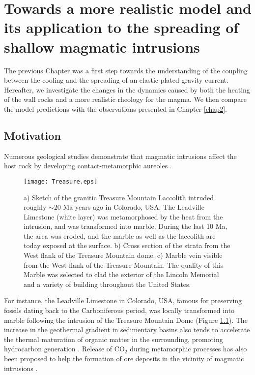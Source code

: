 \chapter[Towards a more realistic model]{Towards a more realistic model
  and its application to the spreading of shallow magmatic intrusions}
\label{Heating}

\minitoc

The previous Chapter was a first  step towards the understanding of the
coupling between  the cooling and  the spreading of  an elastic-plated
gravity  current.   Hereafter,  we  investigate  the  changes  in  the
dynamics  caused by  both the  heating of  the wall  rocks and  a more
realistic  rheology  for  the  magma.    We  then  compare  the  model
predictions with the observations presented in Chapter \ref{chap2}.


\section{Motivation}
\label{sec:introduction}

Numerous  geological  studies  demonstrate  that  magmatic  intrusions
affect  the  host  rock  by  developing  contact-metamorphic  aureoles
\citep{Jaeger:1959du,Galushkin:1997dy,Senger:2014tt}.  
\begin{figure}[h!]
  \begin{center}
    \graphicspath{ {/Users/thorey/Documents/These/Manuscript/Figure/Chapter4/} }
    \texttt{[image: Treasure.eps]}
    \caption{a)  Sketch of  the granitic  Treasure Mountain  Laccolith
      intruded roughly  $\sim 20$ Ma  years ago in Colorado,  USA. The
      Leadville Limestone (white layer)  was metamorphosed by the heat
      from the intrusion, and was transformed into marble.  During the
      last $10$ Ma, the area was eroded, and the marble as well as the
      laccolith are today exposed at the surface.  b) Cross section of
      the strata from the West flank of the Treasure Mountain dome. c)
      Marble  vein  visible  from  the  West  flank  of  the  Treasure
      Mountain. The  quality of this  Marble was selected to  clad the
      exterior  of the  Lincoln  Memorial and  a  variety of  building
      throughout the United States.}
    \label{Treasure}
  \end{center}
\end{figure}
 For  instance,
the  Leadville  Limestone  in  Colorado, USA,  famous  for  preserving
fossils  dating   back  to  the  Carboniferous   period,  was  locally
transformed  into  marble  following  the intrusion  of  the  Treasure
Mountain Dome (Figure \ref{Treasure}).  The increase in the geothermal
gradient in  sedimentary basins also  tends to accelerate  the thermal
maturation of organic matter in the surrounding, promoting hydrocarbon
generation   \citep{Senger:2014tt}.    Release    of   CO$_2$   during
metamorphic processes has also been  proposed to help the formation of
ore    deposits   in    the    vicinity    of   magmatic    intrusions
\citep{SILLITOE:1998bs,Ganino:2008ft,Zhou:2008hc}.

